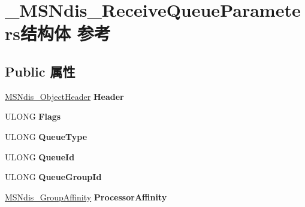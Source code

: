 \hypertarget{struct___m_s_ndis___receive_queue_parameters}{}\section{\+\_\+\+M\+S\+Ndis\+\_\+\+Receive\+Queue\+Parameters结构体 参考}
\label{struct___m_s_ndis___receive_queue_parameters}
\subsection*{Public 属性}
\begin{DoxyCompactItemize}
\item 
\mbox{\label{struct___m_s_ndis___receive_queue_parameters_adc3f94c3cfe76ae909eafcf583fdf95d}} 
\hyperlink{struct___m_s_ndis___object_header}{M\+S\+Ndis\+\_\+\+Object\+Header} {\bfseries Header}
\item 
\mbox{\label{struct___m_s_ndis___receive_queue_parameters_ad817b3cc16f956fce991eaf406244b0e}} 
U\+L\+O\+NG {\bfseries Flags}
\item 
\mbox{\label{struct___m_s_ndis___receive_queue_parameters_a3619864ab8ac5c0b2b58bc8e30c35e9b}} 
U\+L\+O\+NG {\bfseries Queue\+Type}
\item 
\mbox{\label{struct___m_s_ndis___receive_queue_parameters_a6786dd01db328d78455e0ebd00549cf3}} 
U\+L\+O\+NG {\bfseries Queue\+Id}
\item 
\mbox{\label{struct___m_s_ndis___receive_queue_parameters_aadd1585b1b185eb68ecba87ec155e22a}} 
U\+L\+O\+NG {\bfseries Queue\+Group\+Id}
\item 
\mbox{\label{struct___m_s_ndis___receive_queue_parameters_a9aa44ccfbf823eccc925b2baea59bf13}} 
\hyperlink{struct___m_s_ndis___group_affinity}{M\+S\+Ndis\+\_\+\+Group\+Affinity} {\bfseries Processor\+Affinity}
\item 
\mbox{\label{struct___m_s_ndis___receive_queue_parameters_a9501d0dc64ea990cdee53fc498b86052}} 

\end{DoxyCompactItemize}
